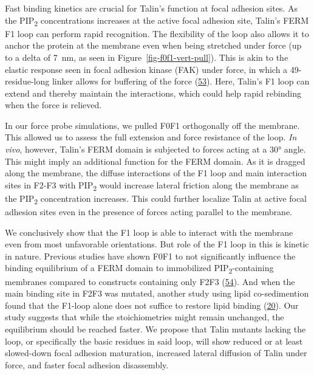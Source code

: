 \documentclass[
  twocolumn]{biophys-new-mod}
\begin{document}
Fast binding kinetics are crucial for Talin's function at focal adhesion
sites. As the PIP\textsubscript{2} concentrations increases at the
active focal adhesion site, Talin's FERM F1 loop can perform rapid
recognition. The flexibility of the loop also allows it to anchor the
protein at the membrane even when being stretched under force (up to a
delta of 7~nm, as seen in Figure~\ref{fig-f0f1-vert-pull}). This is akin
to the elastic response seen in focal adhesion kinase (FAK) under force,
in which a 49-residue-long linker allows for buffering of the force
(\protect\hyperlink{ref-bauerStructuralMechanisticInsights2019}{53}).
Here, Talin's F1 loop can extend and thereby maintain the interactions,
which could help rapid rebinding when the force is relieved.

In our force probe simulations, we pulled F0F1 orthogonally off the
membrane. This allowed us to assess the full extension and force
resistance of the loop. \emph{In vivo}, however, Talin's FERM domain is
subjected to forces acting at a 30° angle. This might imply an
additional function for the FERM domain. As it is dragged along the
membrane, the diffuse interactions of the F1 loop and main interaction
sites in F2-F3 with PIP\textsubscript{2} would increase lateral friction
along the membrane as the PIP\textsubscript{2} concentration increases.
This could further localize Talin at active focal adhesion sites even in
the presence of forces acting parallel to the membrane.

We conclusively show that the F1 loop is able to interact with the
membrane even from most unfavorable orientations. But role of the F1
loop in this is kinetic in nature. Previous studies have shown F0F1 to
not significantly influence the binding equilibrium of a FERM domain to
immobilized PIP\textsubscript{2}-containing membranes compared to
constructs containing only F2F3
(\protect\hyperlink{ref-mooreAffinityTalin1V3integrin2012a}{54}). And
when the main binding site in F2F3 was mutated, another study using
lipid co-sedimention found that the F1-loop alone does not suffice to
restore lipid binding
(\protect\hyperlink{ref-chinthalapudiInteractionTalinCell2018a}{20}).
Our study suggests that while the stoichiometries might remain
unchanged, the equilibrium should be reached faster. We propose that
Talin mutants lacking the loop, or specifically the basic residues in
said loop, will show reduced or at least slowed-down focal adhesion
maturation, increased lateral diffusion of Talin under force, and faster
focal adhesion disassembly.
\end{document}
